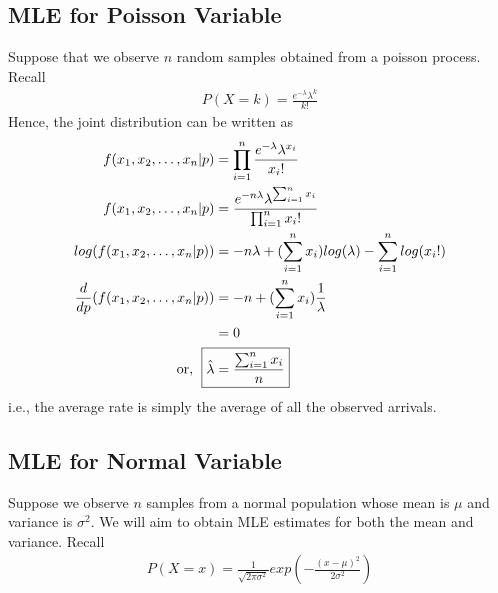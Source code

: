 \documentclass[../probability-notes.tex]{subfiles}
\begin{document}
    \subsection{MLE for Poisson Variable}
    Suppose that we observe $n$ random samples obtained from a poisson process. Recall
    \begin{align*}
        P(X = k) = \frac{e^{-\lambda} \lambda^{k}}{k!}
    \end{align*}
    Hence, the joint distribution can be written as
    \begin{align*}
        f(x_{1}, x_{2}, \ldots, x_{n}|p) &= \prod_{i=1}^{n} \frac{e^{-\lambda} \lambda^{x_{i}}}{x_{i}!}\\
        f(x_{1}, x_{2}, \ldots, x_{n}|p) &= \frac{e^{-n\lambda} \lambda^{\sum_{i=1}^{n} x_{i}}}{\prod_{i=1}^{n} x_{i}!}\\
        log(f(x_{1}, x_{2}, \ldots, x_{n}|p)) &= -n\lambda + (\sum_{i=1}^{n} x_{i})log(\lambda) - \sum_{i=1}^{n} log(x_{i}!)\\
        \frac{d}{dp}(f(x_{1}, x_{2}, \ldots, x_{n}|p)) &= -n + (\sum_{i=1}^{n} x_{i})\frac{1}{\lambda}\\
        &= 0\\
        \text{or, \;} \Aboxed{\hat{\lambda} &= \frac{\sum_{i=1}^{n} x_{i}}{n}}
    \end{align*}
    i.e., the average rate is simply the average of all the observed arrivals.

    
    \subsection{MLE for Normal Variable}
    Suppose we observe $n$ samples from a normal population whose mean is $\mu$ and variance is $\sigma^{2}$. We will aim to obtain MLE estimates for both the mean and variance. Recall
    \begin{align*}
         P(X = x) = \frac{1}{\sqrt{2 \pi \sigma^{2}}} exp(-\frac{(x-\mu)^{2}}{2\sigma^{2}})
    \end{align*}
\end{document}
